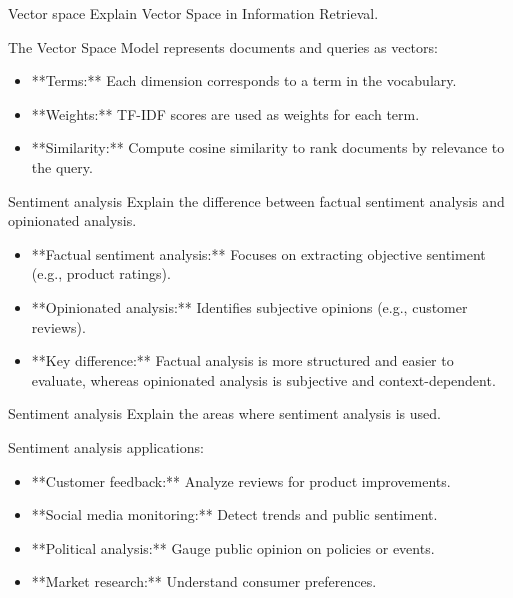 \documentclass{article}
\begin{document}
\begin{exercise}{Vector space}
  Explain Vector Space in Information Retrieval.

  \begin{solution}
    The Vector Space Model represents documents and queries as vectors:
    \begin{itemize}
        \item **Terms:** Each dimension corresponds to a term in the vocabulary.
        \item **Weights:** TF-IDF scores are used as weights for each term.
        \item **Similarity:** Compute cosine similarity to rank documents by relevance to the query.
    \end{itemize}
  \end{solution}
\end{exercise}

\begin{exercise}{Sentiment analysis}
  Explain the difference between factual sentiment analysis and opinionated analysis.

  \begin{solution}
    \begin{itemize}
        \item **Factual sentiment analysis:** Focuses on extracting objective sentiment (e.g., product ratings).
        \item **Opinionated analysis:** Identifies subjective opinions (e.g., customer reviews).
        \item **Key difference:** Factual analysis is more structured and easier to evaluate, whereas opinionated analysis is subjective and context-dependent.
    \end{itemize}
  \end{solution}
\end{exercise}

\begin{exercise}{Sentiment analysis}
  Explain the areas where sentiment analysis is used.

  \begin{solution}
    Sentiment analysis applications:
    \begin{itemize}
        \item **Customer feedback:** Analyze reviews for product improvements.
        \item **Social media monitoring:** Detect trends and public sentiment.
        \item **Political analysis:** Gauge public opinion on policies or events.
        \item **Market research:** Understand consumer preferences.
    \end{itemize}
  \end{solution}
\end{exercise}
\end{document}
